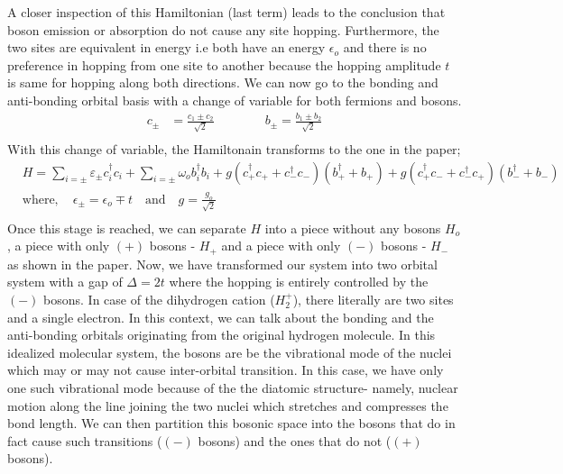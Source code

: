 \documentclass{article}
\begin{document}
A closer inspection of this Hamiltonian (last term) leads to the conclusion that boson emission or absorption do not cause any site hopping. Furthermore, the two sites are equivalent in energy i.e both have an energy $\epsilon_o$ and there is no preference in hopping from one site to another because the hopping amplitude $t$ is same for hopping along both directions. We can now go to the bonding and anti-bonding orbital basis with a change of variable for both fermions and bosons.
\begin{equation}
\begin{aligned}
    c_\pm&= \frac{c_1 \pm c_2}{\sqrt{2}}\qquad\qquad b_\pm= \frac{b_1 \pm b_2}{\sqrt{2}}\\
\end{aligned}
\end{equation}
With this change of variable, the Hamiltonain transforms to the one in the paper;
\begin{equation}
\begin{aligned}
&H=  \sum_{i=\pm} \varepsilon_\pm c_i^\dagger c_i  +  \sum_{i=\pm}\omega_o b_i^\dagger b_i +  g(c_+^\dagger c_+ + c_-^\dagger c_-)(b_+^\dagger + b_+)  +g(c_+^\dagger c_- + c_-^\dagger c_+)(b_-^\dagger + b_-)\\
&\text{where},\quad \epsilon_\pm = \epsilon_o\mp t \quad\text{and}\quad g = \frac{g_o}{\sqrt{2}}\\
\end{aligned}
\label {Holstein}
\end{equation}
Once this stage is reached, we can separate $H$ into a piece without any bosons $H_o$, a piece with only $(+)$ bosons - $H_+$ and a piece with only $(-)$ bosons - $H_-$ as shown in the paper. Now, we have transformed our system into two orbital system with a gap of $\Delta =2t$ where the hopping is entirely controlled by the $(-)$ bosons.
In case of the dihydrogen cation ($H_2^+$), there literally are two sites and a single electron. In this context, we can talk about the bonding and the anti-bonding orbitals originating from the original hydrogen molecule. In this idealized molecular system, the bosons are be the vibrational mode of the nuclei which may or may not cause inter-orbital transition. In this case, we have only one such vibrational mode because of the the diatomic structure- namely, nuclear motion along the line joining the two nuclei which stretches and compresses the bond length. We can then partition this bosonic space into the bosons that do in fact cause such transitions ($(-)$ bosons) and the ones that do not ($(+)$ bosons). 
\end{document}
